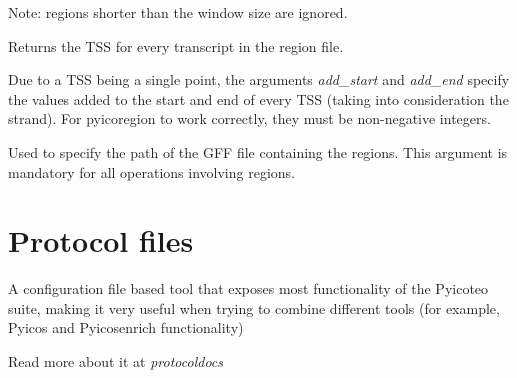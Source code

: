 \documentclass[letterpaper,10pt,english]{sphinxmanual}
\begin{document}
\begin{fulllineitems}
\begin{fulllineitems}
Note: regions shorter than the window size are ignored.

\end{fulllineitems}



\begin{fulllineitems}
Returns the TSS for every transcript in the region file.

Due to a TSS being a single point, the arguments \emph{add\_start} and \emph{add\_end} specify the values added to the start and end of every TSS (taking into consideration the strand). For pyicoregion to work correctly, they must be non-negative integers.

\end{fulllineitems}


\end{fulllineitems}


\begin{fulllineitems}
\label{pyicoregion:cmdoption--gff-file}
Used to specify the path of the GFF file containing the regions. This argument is mandatory for all operations involving regions.

\end{fulllineitems}



\chapter{Protocol files}
\label{index:protocol-files}
A configuration file based tool that exposes most functionality of the Pyicoteo suite, making it very useful when trying to combine different tools (for example, Pyicos and Pyicosenrich functionality)

Read more about it at \emph{protocoldocs}



\renewcommand{\indexname}{Index}
\printindex
\end{document}
